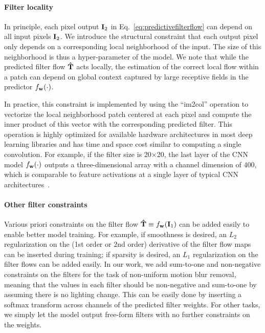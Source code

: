 \documentclass[10pt,twocolumn,letterpaper]{article}
\def\I{{\bf I}}
\def\w{{\bf w}}
\begin{document}
\paragraph{Filter locality} In principle, each pixel output $\I_2$
in Eq.~\ref{eq:predictivefilterflow} can depend on all input pixels $\I_2$. We
introduce the structural constraint that each output pixel only depends on a
corresponding local neighborhood of the input.  The size of this neighborhood
is thus a hyper-parameter of the model. We note that while the predicted
filter flow ${\bf {\hat T}}$ acts locally, the estimation of the correct local
flow within a patch can depend on global context captured by large receptive
fields in the predictor $f_\w(\cdot)$.

In practice, this constraint is implemented by using the ``im2col'' operation
to vectorize the local neighborhood patch centered at each pixel and compute
the inner product of this vector with the corresponding predicted filter.  This
operation is highly optimized for available hardware architectures in most deep
learning libraries and has time and space cost similar to computing a single
convolution. For example, if the filter size is 20$\times$20, the last layer of
the CNN model $f_\w(\cdot)$ outputs a three-dimensional array with a channel
dimension of $400$, which is comparable to feature activations at a single
layer of typical CNN
architectures~\cite{krizhevsky2012imagenet,simonyan2014very,he2016deep}.


\paragraph{Other filter constraints}
Various priori constraints on the filter flow ${\bf \hat T}\equiv f_{\w}(\I_1)$
can be added easily to enable better model training.
For example, if smoothness is desired, an $L_2$ regularization on the (1st
order or 2nd order) derivative of the filter flow maps can be inserted during
training; if sparsity is desired, an $L_1$ regularization on the filter flows
can be added easily.  In our work, we add sum-to-one and non-negative
constraints on the filters for the task of non-uniform motion blur removal,
meaning that the values in each filter should be non-negative and sum-to-one by
assuming there is no lighting change.  This can be easily done by inserting a
softmax transform across channels of the predicted filter weights.
For other tasks, we simply let the model output free-form filters with
no further constraints on the weights.
\end{document}
